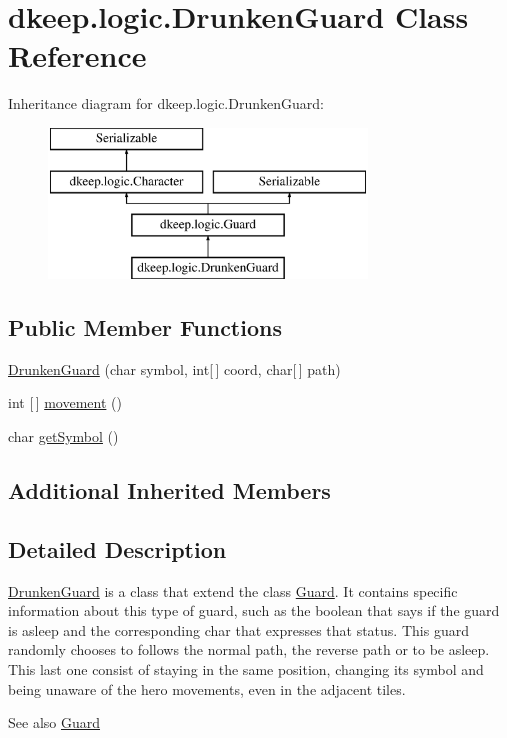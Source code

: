 \hypertarget{classdkeep_1_1logic_1_1_drunken_guard}{}\section{dkeep.\+logic.\+Drunken\+Guard Class Reference}
\label{classdkeep_1_1logic_1_1_drunken_guard}
Inheritance diagram for dkeep.\+logic.\+Drunken\+Guard\+:\begin{figure}[H]
\begin{center}
\leavevmode
\includegraphics[height=4.000000cm]{classdkeep_1_1logic_1_1_drunken_guard}
\end{center}
\end{figure}
\subsection*{Public Member Functions}
\begin{DoxyCompactItemize}
\item 
\hyperlink{classdkeep_1_1logic_1_1_drunken_guard_a8779127a311ed0f350abb672304854db}{Drunken\+Guard} (char symbol, int\mbox{[}$\,$\mbox{]} coord, char\mbox{[}$\,$\mbox{]} path)
\item 
int \mbox{[}$\,$\mbox{]} \hyperlink{classdkeep_1_1logic_1_1_drunken_guard_ade9c30f28e40df9049472a5807c2b79e}{movement} ()
\item 
char \hyperlink{classdkeep_1_1logic_1_1_drunken_guard_a03c948e95e3c62b9708b4c5a6b8770f8}{get\+Symbol} ()
\end{DoxyCompactItemize}
\subsection*{Additional Inherited Members}


\subsection{Detailed Description}
\hyperlink{classdkeep_1_1logic_1_1_drunken_guard}{Drunken\+Guard} is a class that extend the class \hyperlink{classdkeep_1_1logic_1_1_guard}{Guard}. It contains specific information about this type of guard, such as the boolean that says if the guard is asleep and the corresponding char that expresses that status. This guard randomly chooses to follows the normal path, the reverse path or to be asleep. This last one consist of staying in the same position, changing it\textquotesingle{}s symbol and being unaware of the hero movements, even in the adjacent tiles. \begin{DoxySeeAlso}{See also}
\hyperlink{classdkeep_1_1logic_1_1_guard}{Guard} 
\end{DoxySeeAlso}


